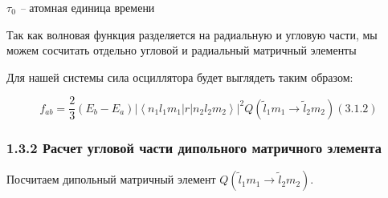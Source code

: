 \documentclass[a4paper]{article}
\begin{document}
 $\tau _0$\textit{ -- }атомная
единица времени

Так как волновая функция разделяется на радиальную и угловую части, мы можем сосчитать отдельно угловой и радиальный матричный элементы

Для нашей системы сила осциллятора будет выглядеть таким образом:

\begin{equation*}
f_{ab}=\frac 2 3 \left(E_b-E_a\right) \left| \left< n_1l_1m_1\left|r\right|n_2l_2m_2 \right> \right|^2 Q\left(\widetilde l_1m_1\rightarrow \widetilde l_2m_2\right) (3.1.2)
\end{equation*}
\subsubsection[1.3.2 Расчет угловой
части дипольного матричного
элемента]{1.3.2 Расчет
угловой части дипольного матричного
элемента}
\hypertarget{RefHeading4691463868395}{}Посчитаем
дипольный матричный элемент  $Q\left(\widetilde l_1m_1\rightarrow \widetilde l_2m_2\right)$.
\end{document}
